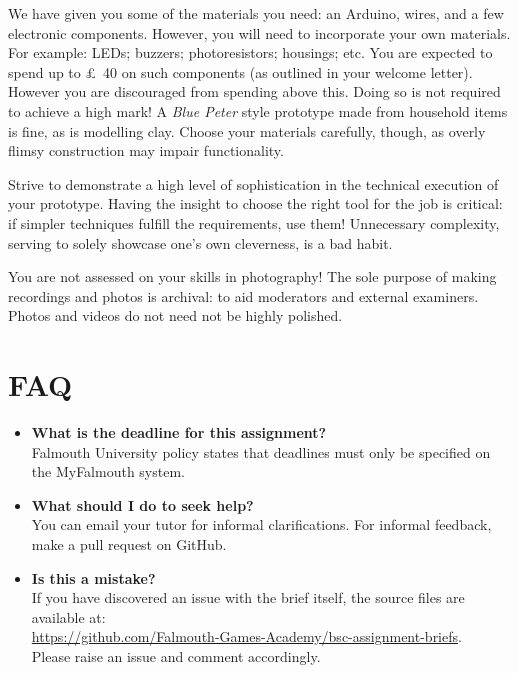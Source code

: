\documentclass{../../fal_assignment}
\begin{document}
We have given you some of the materials you need: an Arduino, wires, and a few electronic components. However, you will need to incorporate your own materials. For example: LEDs; buzzers; photoresistors; housings; etc. You are expected to spend up to \pounds~40 on such components (as outlined in your welcome letter). However you are discouraged from spending above this. Doing so is not required to achieve a high mark! A \textit{Blue Peter} style prototype made from household items is fine, as is modelling clay. Choose your materials carefully, though, as overly flimsy construction may impair functionality. 

Strive to demonstrate a high level of sophistication in the technical execution of your prototype. Having the insight to choose the right tool for the job is critical: if simpler techniques fulfill the requirements, use them! Unnecessary complexity, serving to solely showcase one's own cleverness, is a bad habit. 

You are not assessed on your skills in photography! The sole purpose of making recordings and photos is archival: to aid moderators and external examiners. Photos and videos do not need not be highly polished. 

\section*{FAQ}

\begin{itemize}
	\item 	\textbf{What is the deadline for this assignment?} \\ 
	Falmouth University policy states that deadlines must only be specified on the MyFalmouth system.
	
	\item 	\textbf{What should I do to seek help?} \\ 
	You can email your tutor for informal clarifications. For informal feedback, make a pull request on GitHub. 
	
	\item 	\textbf{Is this a mistake?} \\ 	
	If you have discovered an issue with the brief itself, the source files are available at: \\
	\url{https://github.com/Falmouth-Games-Academy/bsc-assignment-briefs}.\\
	Please raise an issue and comment accordingly.
\end{itemize}
\end{document}
